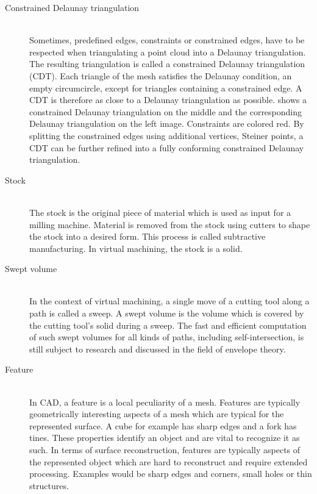 \begin{description}
	\item[Constrained Delaunay triangulation] \hfill \\
	Sometimes, predefined edges, \ie constraints or constrained edges, have to be respected when triangulating a point cloud into a Delaunay triangulation.
	The resulting triangulation is called a constrained Delaunay triangulation (CDT).
	Each triangle of the mesh satisfies the Delaunay condition, \ie an empty circumcircle, except for triangles containing a constrained edge.
	A CDT is therefore as close to a Delaunay triangulation as possible.
	 shows a constrained Delaunay triangulation on the middle and the corresponding Delaunay triangulation on the left image.
	Constraints are colored red.
	By splitting the constrained edges using additional vertices, \ie Steiner points, a CDT can be further refined into a fully conforming constrained Delaunay triangulation.


	\item[Stock] \hfill \\
	The stock is the original piece of material which is used as input for a milling machine.
	Material is removed from the stock using cutters to shape the stock into a desired form.
	This process is called subtractive manufacturing.
	In virtual machining, the stock is a solid.


	\item[Swept volume] \hfill \\
	In the context of virtual machining, a single move of a cutting tool along a path is called a sweep.
	A swept volume is the volume which is covered by the cutting tool's solid during a sweep.
	The fast and efficient computation of such swept volumes for all kinds of paths, including self-intersection, is still subject to research and discussed in the field of envelope theory.


	\item[Feature] \hfill \\
	In CAD, a feature is a local peculiarity of a mesh.
	Features are typically geometrically interesting aspects of a mesh which are typical for the represented surface.
	A cube for example has sharp edges and a fork has tines.
	These properties identify an object and are vital to recognize it as such.
	In terms of surface reconstruction, features are typically aspects of the represented object which are hard to reconstruct and require extended processing.
	Examples would be sharp edges and corners, small holes or thin structures.

\end{description}

